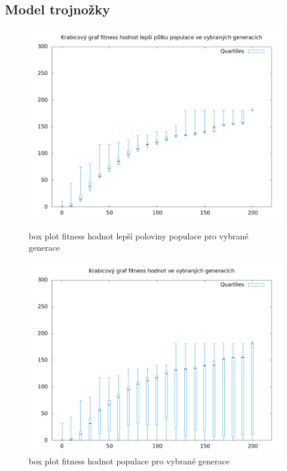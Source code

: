 \subsection{Model trojnožky}
\begin{figure}[h]
    \begin{minipage}[c]{0.48\linewidth}
        \includegraphics[width=\linewidth]{obrazky/bar_whisker_trojnozka_primka_top50.png}
        \caption{box plot fitness hodnot lepší poloviny populace pro vybrané generace}
    \end{minipage}
    \hfill
    \begin{minipage}[c]{0.48\linewidth}
        \includegraphics[width=\linewidth]{obrazky/bar_whisker_trojnozka_primka.png}
        \caption{box plot fitness hodnot populace pro vybrané generace}
    \end{minipage}
\end{figure}

